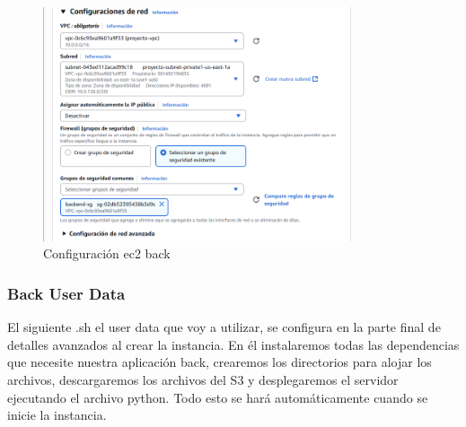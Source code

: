\documentclass{article}
\begin{document}
			
	\begin{figure}[H]
	\centering
	\includegraphics[width=0.82\textwidth]{configuracion_ec2_back.png}
	\caption{Configuración ec2 back}
	\end{figure}

	\subsubsection{Back User Data}
	El siguiente .sh el user data que voy a utilizar, se configura en la parte final de detalles avanzados al crear la instancia. En él instalaremos todas las dependencias que necesite nuestra aplicación back, crearemos los directorios para alojar los archivos, descargaremos los archivos del S3 y desplegaremos el servidor ejecutando el archivo python. Todo esto se hará automáticamente cuando se inicie la instancia. 
\end{document}
